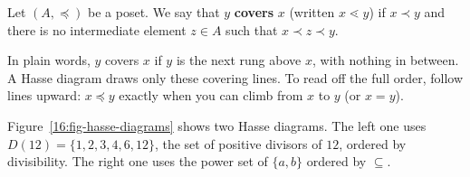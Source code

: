 \begin{definition}
Let $(A, \preceq)$ be a poset. We say that $y$ \textbf{covers} $x$ (written $x \lessdot y$) if $x \prec y$ and there is no intermediate element $z \in A$ such that $x \prec z \prec y$.
\end{definition}

In plain words, $y$ covers $x$ if $y$ is the next rung above $x$, with nothing in between. A Hasse diagram draws only these covering lines. To read off the full order, follow lines upward: $x \preceq y$ exactly when you can climb from $x$ to $y$ (or $x = y$).

Figure~\ref{16:fig-hasse-diagrams} shows two Hasse diagrams. The left one uses $D(12) = \{1, 2, 3, 4, 6, 12\}$, the set of positive divisors of $12$, ordered by divisibility. The right one uses the power set of $\{a, b\}$ ordered by $\subseteq$.

